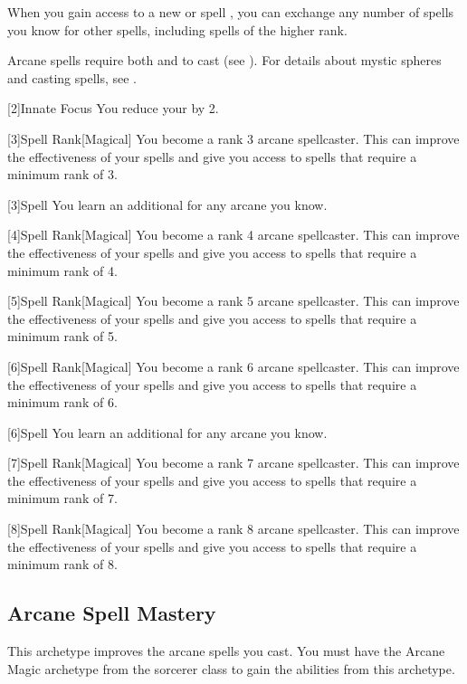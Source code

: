         When you gain access to a new  or spell ,
            you can exchange any number of spells you know for other spells,
            including spells of the higher rank.

        Arcane spells require both  and  to cast (see ).
        For details about mystic spheres and casting spells, see .

        [2]{Innate Focus} You reduce your  by 2.

        [3]{Spell Rank}[Magical] You become a rank 3 arcane spellcaster.
        This can improve the effectiveness of your spells and give you access to spells that require a minimum rank of 3.

        [3]{Spell} You learn an additional  for any arcane  you know.

        [4]{Spell Rank}[Magical] You become a rank 4 arcane spellcaster.
        This can improve the effectiveness of your spells and give you access to spells that require a minimum rank of 4.

        [5]{Spell Rank}[Magical] You become a rank 5 arcane spellcaster.
        This can improve the effectiveness of your spells and give you access to spells that require a minimum rank of 5.

        [6]{Spell Rank}[Magical] You become a rank 6 arcane spellcaster.
        This can improve the effectiveness of your spells and give you access to spells that require a minimum rank of 6.

        [6]{Spell} You learn an additional  for any arcane  you know.

        [7]{Spell Rank}[Magical] You become a rank 7 arcane spellcaster.
        This can improve the effectiveness of your spells and give you access to spells that require a minimum rank of 7.

        [8]{Spell Rank}[Magical] You become a rank 8 arcane spellcaster.
        This can improve the effectiveness of your spells and give you access to spells that require a minimum rank of 8.

    \subsection{Arcane Spell Mastery}
        This archetype improves the arcane spells you cast.
        You must have the Arcane Magic archetype from the sorcerer class to gain the abilities from this archetype.

